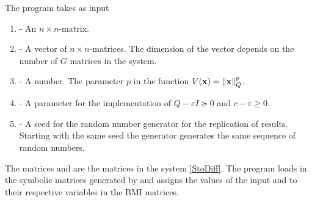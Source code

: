 \documentclass[a4paper,12pt,twoside,BCOR=10mm]{scrbook}
\begin{document}
The program  takes as input
\begin{enumerate}
    \item {} - An $n\times n$-matrix.
    \item {} - A vector of $n \times n$-matrices. The dimension of the vector depends on the number of $G$ matrices in the system.
    \item {} - A number. The parameter $p$ in the function $V(\mathbf{x}) = \left\lVert\mathbf{x}\right\rVert_Q^p$.
    \item {} - A parameter for the implementation of $Q - \varepsilon I \succeq 0$ and $c - \varepsilon \geq 0$.
    \item {} - A seed for the random number generator for the replication of results. Starting with the same seed the generator generates the same sequence of random numbers.
\end{enumerate}

The matrices  and  are the matrices in the system \eqref{StoDiff}. The program loads in the symbolic matrices generated by  and assigns the values of the input  and  to their respective variables in the BMI matrices.
\end{document}
